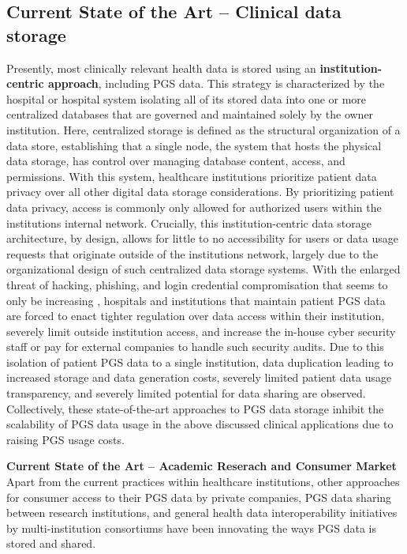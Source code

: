 \documentclass[runningheads]{llncs}
\begin{document}
\subsection{Current State of the Art -- Clinical data storage}
Presently, most clinically relevant health data is stored using an \textbf{institution-centric approach}, including PGS data. 
This strategy is characterized by the hospital or hospital system isolating all of its stored data into one or more centralized databases that are governed and maintained solely by the owner institution. 
Here, centralized storage is defined as the structural organization of a data store, establishing that a single node, the system that hosts the physical data storage, has control over managing database content, access, and permissions. 
With this system, healthcare institutions prioritize patient data privacy over all other digital data storage considerations. 
By prioritizing patient data privacy, access is commonly only allowed for authorized users within the institution\textquotesingle s internal network. 
Crucially, this institution-centric data storage architecture, by design, allows for little to no accessibility for users or data usage requests that originate outside of the institution\textquotesingle s network, largely due to the organizational design of such centralized data storage systems. 
With the enlarged threat of hacking, phishing, and login credential compromisation that seems to only be increasing \cite{noauthor_ransomware_nodate}, hospitals and institutions that maintain patient PGS data are forced to enact tighter regulation over data access within their institution, severely limit outside institution access, and increase the in-house cyber security staff or pay for external companies to handle such security audits.  
Due to this isolation of patient PGS data to a single institution, data duplication leading to increased storage and data generation costs, severely limited patient data usage transparency, and severely limited potential for data sharing are observed. 
Collectively, these state-of-the-art approaches to PGS data storage inhibit the scalability of PGS data usage in the above discussed clinical applications due to raising PGS usage costs.


\textbf{Current State of the Art -- Academic Reserach and Consumer Market}
Apart from the current practices within healthcare institutions, other approaches for consumer access to their PGS data by private companies, PGS data sharing between research institutions, and general health data interoperability initiatives by multi-institution consortiums have been innovating the ways PGS data is stored and shared. 
\end{document}
